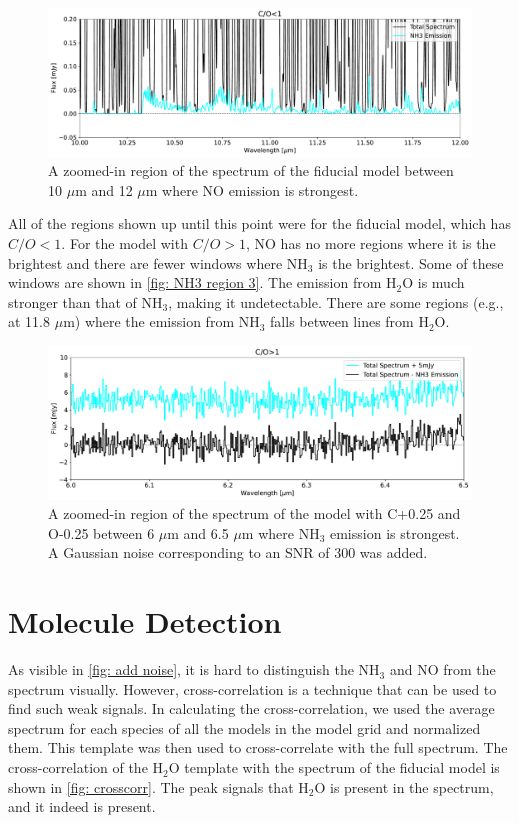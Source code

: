 \documentclass[twoside, single, authoryear, semicolon, 12pt]{lion-msc}
\newcommand{\4}{$_4$}
\newcommand{\3}{$_3$}
\newcommand{\2}{$_2$}
\begin{document}
\begin{figure}[H]
    \centering
    \includegraphics[width=\linewidth]{Figures/NH3_region3.pdf}
    \caption{A zoomed-in region of the spectrum of the fiducial model between 10 $\mu$m and 12 $\mu$m where NO emission is strongest.}
    \label{fig: NH3 region 3}
\end{figure}

All of the regions shown up until this point were for the fiducial model, which has $C/O<1$. For the model with $C/O>1$, NO has no more regions where it is the brightest and there are fewer windows where NH\3 is the brightest. Some of these windows are shown in \autoref{fig: NH3 region 3}. The emission from H\2O is much stronger than that of NH\3, making it undetectable. There are some regions (e.g., at 11.8 $\mu$m) where the emission from NH\3 falls between lines from H\2O. 

\begin{figure}[H]
    \centering
    \includegraphics[width=\linewidth]{Figures/AddNoise.pdf}
    \caption{A zoomed-in region of the spectrum of the model with C+0.25 and O-0.25 between 6 $\mu$m and 6.5 $\mu$m where NH\3 emission is strongest. A Gaussian noise corresponding to an SNR of 300 was added.}
    \label{fig: add noise}
\end{figure}

\section{Molecule Detection}
As visible in \autoref{fig: add noise}, it is hard to distinguish the NH\3 and NO from the spectrum visually. However, cross-correlation is a technique that can be used to find such weak signals. In calculating the cross-correlation, we used the average spectrum for each species of all the models in the model grid and normalized them. This template was then used to cross-correlate with the full spectrum. The cross-correlation of the H\2O template with the spectrum of the fiducial model is shown in \autoref{fig: crosscorr}. The peak signals that H\2O is present in the spectrum, and it indeed is present. 
\end{document}
